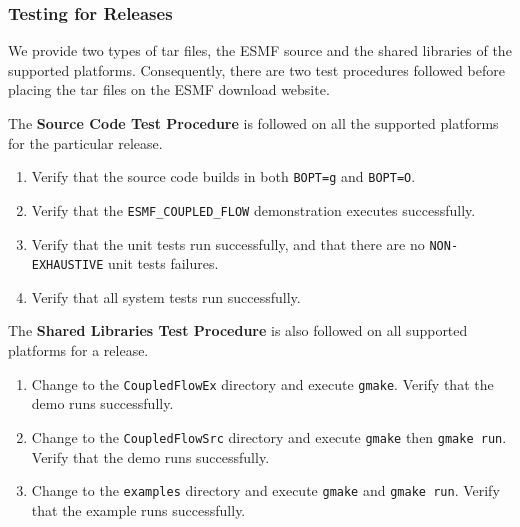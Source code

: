 \subsubsection{Testing for Releases}

We provide two types of tar files, the ESMF source and the shared
libraries of the supported platforms. Consequently, there are two test
procedures followed before placing the tar files on the ESMF download website. 

The {\bf Source Code Test Procedure} is followed on all the supported
platforms for the particular release.

\begin{enumerate}
\item Verify that the source code builds in both {\tt BOPT=g} and {\tt BOPT=O}.
\item Verify that  the {\tt ESMF\_COUPLED\_FLOW} demonstration executes successfully.
\item Verify that the unit tests run successfully, and that there are no {\tt NON-EXHAUSTIVE} unit tests  failures.
\item Verify that all system tests run successfully. 
\end{enumerate}

The {\bf Shared Libraries Test Procedure} is also followed on all supported
platforms for a release.

\begin{enumerate}
\item Change to the {\tt CoupledFlowEx} directory and execute {\tt gmake}. Verify that the demo runs successfully.
\item Change to the {\tt CoupledFlowSrc} directory and execute {\tt gmake} then {\tt gmake run}. Verify that the demo runs successfully.
\item Change to the {\tt examples} directory and execute {\tt gmake} and {\tt gmake run}. Verify that the example runs successfully.
\end{enumerate}














